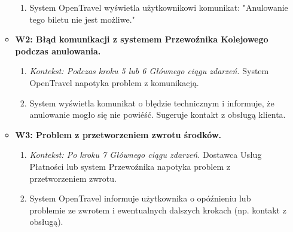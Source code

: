 \documentclass[a4paper,12pt]{article}
\begin{document}
\begin{itemize}
\begin{itemize}
\begin{enumerate}
\item System OpenTravel wyświetla użytkownikowi komunikat: "Anulowanie tego biletu nie jest możliwe."
\end{enumerate}
\item \textbf{W2: Błąd komunikacji z systemem Przewoźnika Kolejowego podczas anulowania.}
\begin{enumerate}
\item \textit{Kontekst: Podczas kroku 5 lub 6 Głównego ciągu zdarzeń.} System OpenTravel napotyka problem z komunikacją.
\item System wyświetla komunikat o błędzie technicznym i informuje, że anulowanie mogło się nie powiéść. Sugeruje kontakt z obsługą klienta.
\end{enumerate}
\item \textbf{W3: Problem z przetworzeniem zwrotu środków.}
\begin{enumerate}
\item \textit{Kontekst: Po kroku 7 Głównego ciągu zdarzeń.} Dostawca Usług Płatności lub system Przewoźnika napotyka problem z przetworzeniem zwrotu.
\item System OpenTravel informuje użytkownika o opóźnieniu lub problemie ze zwrotem i ewentualnych dalszych krokach (np. kontakt z obsługą).
\end{enumerate}
\end{itemize}
\end{itemize}
\end{document}
